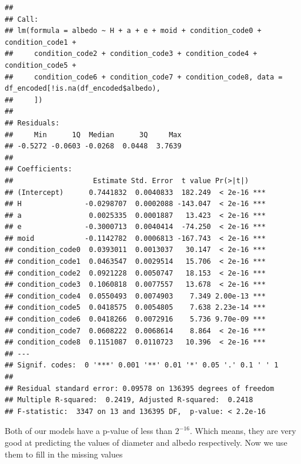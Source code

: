 \documentclass[
]{article}
\newenvironment{Shaded}{\begin{snugshade}}{\end{snugshade}}
\newcommand{\AttributeTok}[1]{\textcolor[rgb]{0.13,0.29,0.53}{#1}}
\newcommand{\FunctionTok}[1]{\textcolor[rgb]{0.13,0.29,0.53}{\textbf{#1}}}
\newcommand{\NormalTok}[1]{#1}
\newcommand{\OtherTok}[1]{\textcolor[rgb]{0.56,0.35,0.01}{#1}}
\newcommand{\SpecialCharTok}[1]{\textcolor[rgb]{0.81,0.36,0.00}{\textbf{#1}}}
\begin{document}
\begin{verbatim}
## 
## Call:
## lm(formula = albedo ~ H + a + e + moid + condition_code0 + condition_code1 + 
##     condition_code2 + condition_code3 + condition_code4 + condition_code5 + 
##     condition_code6 + condition_code7 + condition_code8, data = df_encoded[!is.na(df_encoded$albedo), 
##     ])
## 
## Residuals:
##     Min      1Q  Median      3Q     Max 
## -0.5272 -0.0603 -0.0268  0.0448  3.7639 
## 
## Coefficients:
##                   Estimate Std. Error  t value Pr(>|t|)    
## (Intercept)      0.7441832  0.0040833  182.249  < 2e-16 ***
## H               -0.0298707  0.0002088 -143.047  < 2e-16 ***
## a                0.0025335  0.0001887   13.423  < 2e-16 ***
## e               -0.3000713  0.0040414  -74.250  < 2e-16 ***
## moid            -0.1142782  0.0006813 -167.743  < 2e-16 ***
## condition_code0  0.0393011  0.0013037   30.147  < 2e-16 ***
## condition_code1  0.0463547  0.0029514   15.706  < 2e-16 ***
## condition_code2  0.0921228  0.0050747   18.153  < 2e-16 ***
## condition_code3  0.1060818  0.0077557   13.678  < 2e-16 ***
## condition_code4  0.0550493  0.0074903    7.349 2.00e-13 ***
## condition_code5  0.0418575  0.0054805    7.638 2.23e-14 ***
## condition_code6  0.0418266  0.0072916    5.736 9.70e-09 ***
## condition_code7  0.0608222  0.0068614    8.864  < 2e-16 ***
## condition_code8  0.1151087  0.0110723   10.396  < 2e-16 ***
## ---
## Signif. codes:  0 '***' 0.001 '**' 0.01 '*' 0.05 '.' 0.1 ' ' 1
## 
## Residual standard error: 0.09578 on 136395 degrees of freedom
## Multiple R-squared:  0.2419, Adjusted R-squared:  0.2418 
## F-statistic:  3347 on 13 and 136395 DF,  p-value: < 2.2e-16
\end{verbatim}

Both of our models have a p-value of less than \(2^{-16}\). Which means,
they are very good at predicting the values of diameter and albedo
respectively. Now we use them to fill in the missing values

\begin{Shaded}
\end{Shaded}
\end{document}
